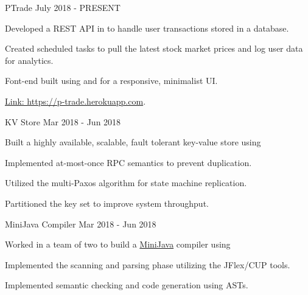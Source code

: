 \begin{cvskills}
    \cvproject
        {PTrade}
        {July 2018 - PRESENT}
        {\begin{cvitems} %
            \item{Developed a REST API in  to handle user transactions stored in a  database.}
            \item{Created scheduled tasks to pull the latest stock market prices and log user data for analytics.}
            \item{Font-end built using  and  for a responsive, minimalist UI.}
            \item{\href{https://p-trade.herokuapp.com}{Link: \color{blue}https://p-trade.herokuapp.com}.}
        \end{cvitems}}
\end{cvskills}

\begin{cvskills}
    \cvproject
        {KV Store}
        {Mar 2018 - Jun 2018}
        {\begin{cvitems} %
            \item{Built a highly available, scalable, fault tolerant key-value store using }
            \item{Implemented at-most-once RPC semantics to prevent duplication.}
            \item{Utilized the multi-Paxos algorithm for state machine replication.}
            \item{Partitioned the key set to improve system throughput.}
        \end{cvitems}}
\end{cvskills}

\begin{cvskills}
    \cvproject
        {MiniJava Compiler}
        {Mar 2018 - Jun 2018}
        {\begin{cvitems} %
            \item{
                Worked in a team of two to build a \href{http://www.cambridge.org/resources/052182060X/}
                {\color{blue}MiniJava} compiler using 
            }
            \item{Implemented the scanning and parsing phase utilizing the JFlex/CUP tools.}
            \item{Implemented semantic checking and code generation using ASTs.}
        \end{cvitems}}
\end{cvskills}

